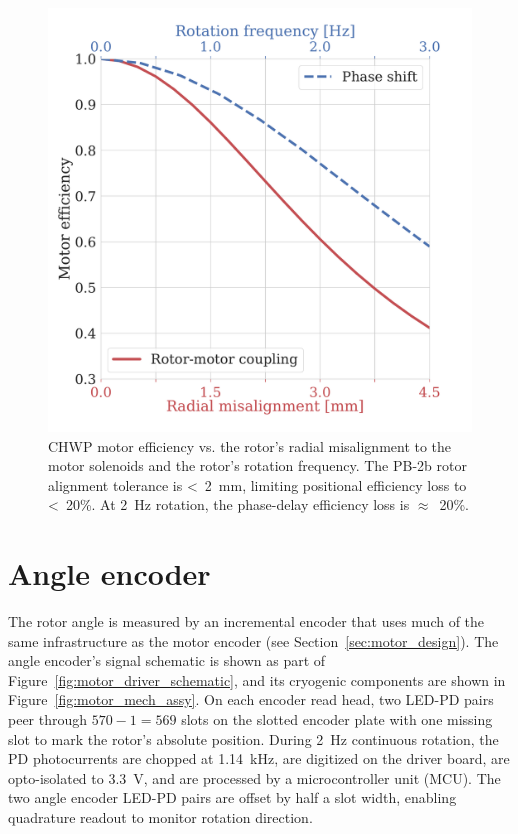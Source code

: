 \begin{figure}[!t]
    \centering
    \includegraphics[width=0.5\linewidth, trim=0.5cm 1cm 2cm 1cm]{CHWPDesign/Figures/motorEff_vs_misalignment_HWPfreq.pdf}
    \caption{CHWP motor efficiency vs. the rotor's radial misalignment to the motor solenoids and the rotor's rotation frequency. The PB-2b rotor alignment tolerance is <~2~mm, limiting positional efficiency loss to <~20\%. At 2~Hz rotation, the phase-delay efficiency loss is $\approx$~20\%.}
    \label{fig:motor_eff}
\end{figure}


\section{Angle encoder}
\label{sec:angle_encoder}

The rotor angle is measured by an incremental encoder that uses much of the same infrastructure as the motor encoder (see Section~\ref{sec:motor_design}). The angle encoder's signal schematic is shown as part of Figure~\ref{fig:motor_driver_schematic}, and its cryogenic components are shown in Figure~\ref{fig:motor_mech_assy}. On each encoder read head, two LED-PD pairs peer through $570 - 1 = 569$ slots on the slotted encoder plate with one missing slot to mark the rotor's absolute position. During 2~Hz continuous rotation, the PD photocurrents are chopped at 1.14~kHz, are digitized on the driver board, are opto-isolated to 3.3~V, and are processed by a microcontroller unit (MCU). The two angle encoder LED-PD pairs are offset by half a slot width, enabling quadrature readout to monitor rotation direction.

